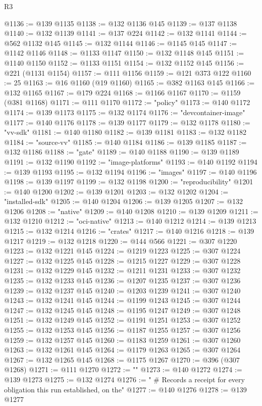 \begin{lexlean}{R3}
\begin{coremodule}
@1136 := @139 @1135
@1138 := @132 @1136 @145
@1139 := @137 @1138
@1140 := @132 @1139
@1141 := @137 @224
@1142 := @132 @1141
@1144 := @562 @1132 @145
@1145 := @132 @1144
@1146 := @1145 @145
@1147 := @1142 @1146
@1148 := @1133 @1147
@1150 := @132 @1148 @145
@1151 := @1140 @1150
@1152 := @1133 @1151
@1154 := @132 @1152 @145
@1156 := @221 (@1131 @1154)
@1157 := @111 @1156
@1159 := @121 @373 @122
@1160 := 25
@1163 := @16 @1160 (@19 @1160)
@1165 := @382 @1163 @145
@1166 := @132 @1165
@1167 := @179 @224
@1168 := @1166 @1167
@1170 := @1159 (@381 @1168)
@1171 := @111 @1170
@1172 := "policy"
@1173 := @140 @1172
@1174 := @139 @1173
@1175 := @132 @1174
@1176 := "devcontainer-image"
@1177 := @140 @1176
@1178 := @139 @1177
@1179 := @132 @1178
@1180 := "vv-sdk"
@1181 := @140 @1180
@1182 := @139 @1181
@1183 := @132 @1182
@1184 := "source-vv"
@1185 := @140 @1184
@1186 := @139 @1185
@1187 := @132 @1186
@1188 := "gate"
@1189 := @140 @1188
@1190 := @139 @1189
@1191 := @132 @1190
@1192 := "image-platforms"
@1193 := @140 @1192
@1194 := @139 @1193
@1195 := @132 @1194
@1196 := "images"
@1197 := @140 @1196
@1198 := @139 @1197
@1199 := @132 @1198
@1200 := "reproducibility"
@1201 := @140 @1200
@1202 := @139 @1201
@1203 := @132 @1202
@1204 := "installed-sdk"
@1205 := @140 @1204
@1206 := @139 @1205
@1207 := @132 @1206
@1208 := "native"
@1209 := @140 @1208
@1210 := @139 @1209
@1211 := @132 @1210
@1212 := "oci-native"
@1213 := @140 @1212
@1214 := @139 @1213
@1215 := @132 @1214
@1216 := "crates"
@1217 := @140 @1216
@1218 := @139 @1217
@1219 := @132 @1218
@1220 := @144 @566
@1221 := @307 @1220
@1223 := @132 @1221 @145
@1224 := @1219 @1223
@1225 := @307 @1224
@1227 := @132 @1225 @145
@1228 := @1215 @1227
@1229 := @307 @1228
@1231 := @132 @1229 @145
@1232 := @1211 @1231
@1233 := @307 @1232
@1235 := @132 @1233 @145
@1236 := @1207 @1235
@1237 := @307 @1236
@1239 := @132 @1237 @145
@1240 := @1203 @1239
@1241 := @307 @1240
@1243 := @132 @1241 @145
@1244 := @1199 @1243
@1245 := @307 @1244
@1247 := @132 @1245 @145
@1248 := @1195 @1247
@1249 := @307 @1248
@1251 := @132 @1249 @145
@1252 := @1191 @1251
@1253 := @307 @1252
@1255 := @132 @1253 @145
@1256 := @1187 @1255
@1257 := @307 @1256
@1259 := @132 @1257 @145
@1260 := @1183 @1259
@1261 := @307 @1260
@1263 := @132 @1261 @145
@1264 := @1179 @1263
@1265 := @307 @1264
@1267 := @132 @1265 @145
@1268 := @1175 @1267
@1270 := @396 (@307 @1268)
@1271 := @111 @1270
@1272 := ""
@1273 := @140 @1272
@1274 := @139 @1273
@1275 := @132 @1274
@1276 := "  # Records a receipt for every obligation this run established, on the"
@1277 := @140 @1276
@1278 := @139 @1277

\end{coremodule}
\end{lexlean}
